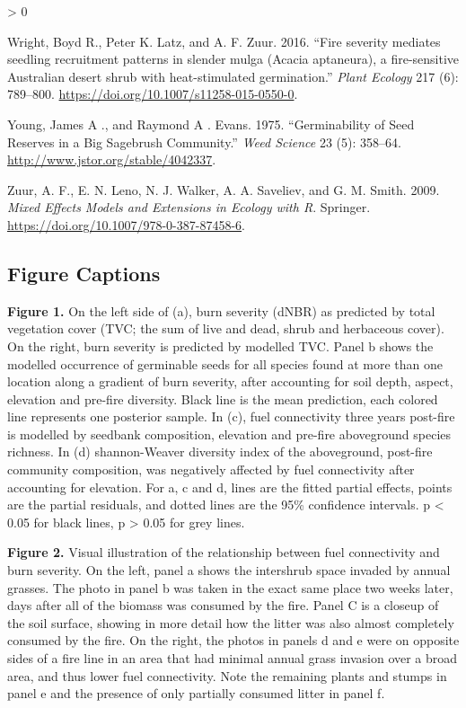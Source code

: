 \documentclass[
  12pt,
]{article}
\newlength{\cslhangindent}
\newenvironment{CSLReferences}[2] %
 {%
  \setlength{\parindent}{0pt}
  \ifodd #1 \everypar{\setlength{\hangindent}{\cslhangindent}}\ignorespaces\fi
  \ifnum #2 > 0
  \setlength{\parskip}{#2\baselineskip}
  \fi
 }%
 {}
\begin{document}
\begin{CSLReferences}{1}{0}
\leavevmode\hypertarget{ref-Wright2016}{}%
Wright, Boyd R., Peter K. Latz, and A. F. Zuur. 2016. {``{Fire severity
mediates seedling recruitment patterns in slender mulga (Acacia
aptaneura), a fire-sensitive Australian desert shrub with
heat-stimulated germination}.''} \emph{Plant Ecology} 217 (6): 789--800.
\url{https://doi.org/10.1007/s11258-015-0550-0}.

\leavevmode\hypertarget{ref-Young1975}{}%
Young, James A ., and Raymond A . Evans. 1975. {``{Germinability of Seed
Reserves in a Big Sagebrush Community}.''} \emph{Weed Science} 23 (5):
358--64. \url{http://www.jstor.org/stable/4042337}.

\leavevmode\hypertarget{ref-Zuur2009}{}%
Zuur, A. F., E. N. Leno, N. J. Walker, A. A. Saveliev, and G. M. Smith.
2009. \emph{{Mixed Effects Models and Extensions in Ecology with R}}.
Springer. \url{https://doi.org/10.1007/978-0-387-87458-6}.

\end{CSLReferences}

\newpage

\hypertarget{figure-captions}{%
\subsection{Figure Captions}\label{figure-captions}}

\textbf{Figure 1.} On the left side of (a), burn severity (dNBR) as
predicted by total vegetation cover (TVC; the sum of live and dead,
shrub and herbaceous cover). On the right, burn severity is predicted by
modelled TVC. Panel b shows the modelled occurrence of germinable seeds
for all species found at more than one location along a gradient of burn
severity, after accounting for soil depth, aspect, elevation and
pre-fire diversity. Black line is the mean prediction, each colored line
represents one posterior sample. In (c), fuel connectivity three years
post-fire is modelled by seedbank composition, elevation and pre-fire
aboveground species richness. In (d) shannon-Weaver diversity index of
the aboveground, post-fire community composition, was negatively
affected by fuel connectivity after accounting for elevation. For a, c
and d, lines are the fitted partial effects, points are the partial
residuals, and dotted lines are the 95\% confidence intervals. p
\textless{} 0.05 for black lines, p \textgreater{} 0.05 for grey lines.

\textbf{Figure 2.} Visual illustration of the relationship between fuel
connectivity and burn severity. On the left, panel a shows the
intershrub space invaded by annual grasses. The photo in panel b was
taken in the exact same place two weeks later, days after all of the
biomass was consumed by the fire. Panel C is a closeup of the soil
surface, showing in more detail how the litter was also almost
completely consumed by the fire. On the right, the photos in panels d
and e were on opposite sides of a fire line in an area that had minimal
annual grass invasion over a broad area, and thus lower fuel
connectivity. Note the remaining plants and stumps in panel e and the
presence of only partially consumed litter in panel f.

\newpage
\end{document}
